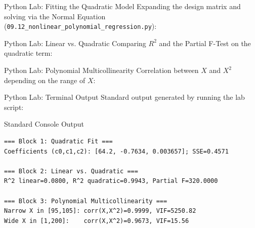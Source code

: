 \documentclass[10pt, aspectratio=169]{beamer}
\begin{document}
\begin{frame}[fragile]{Python Lab: Fitting the Quadratic Model}
  \scriptsize
  Expanding the design matrix and solving via the Normal Equation (\texttt{09.12\_nonlinear\_polynomial\_regression.py}):
  {
  }
\end{frame}

\begin{frame}[fragile]{Python Lab: Linear vs. Quadratic}
  \scriptsize
  Comparing $R^2$ and the Partial F-Test on the quadratic term:
  {
  }
\end{frame}

\begin{frame}[fragile]{Python Lab: Polynomial Multicollinearity}
  \scriptsize
  Correlation between $X$ and $X^2$ depending on the range of $X$:
  {
  }
\end{frame}

\begin{frame}[fragile]{Python Lab: Terminal Output}
  \scriptsize
  Standard output generated by running the lab script:
  \vspace{0.02cm}
  \begin{block}{Standard Console Output}
    \fontsize{3.2pt}{3.9pt}\selectfont
    \begin{verbatim}
=== Block 1: Quadratic Fit ===
Coefficients (c0,c1,c2): [64.2, -0.7634, 0.003657]; SSE=0.4571

=== Block 2: Linear vs. Quadratic ===
R^2 linear=0.0800, R^2 quadratic=0.9943, Partial F=320.0000

=== Block 3: Polynomial Multicollinearity ===
Narrow X in [95,105]: corr(X,X^2)=0.9999, VIF=5250.82
Wide X in [1,200]:    corr(X,X^2)=0.9673, VIF=15.56
    \end{verbatim}
  \end{block}
\end{frame}
\end{document}
